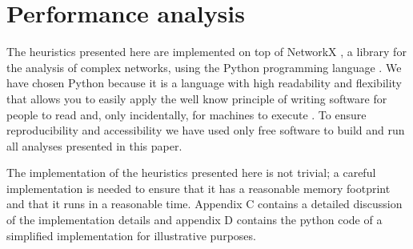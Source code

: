 \newpage

\section{Performance analysis}
\label{performance}

The heuristics presented here are implemented on top of NetworkX \citep{hagberg:2008}, a library for the analysis of complex networks, using the Python programming language \citep{vanrossum:1995}. We have chosen Python because it is a language with high readability and flexibility that allows you to easily apply the well know principle of writing software for people to read and, only incidentally, for machines to execute \citep{abelson:1985}. To ensure reproducibility and accessibility we have used only free software to build and run all analyses presented in this paper. 

The implementation of the heuristics presented here is not trivial; a careful implementation is needed to ensure that it has a reasonable memory footprint and that it runs in a reasonable time. Appendix C contains a detailed discussion of the implementation details and appendix D contains the python code of a simplified implementation for illustrative purposes.

